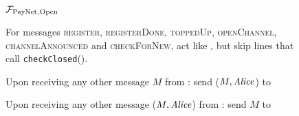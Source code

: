 \begin{figure}[H]
  \begin{systembox}{$\mathcal{F}_{\mathrm{PayNet}}{}_{\mathrm{, Open}}$}
    \begin{algorithmic}[1]
      \State For messages \textsc{register}, \textsc{registerDone},
      \textsc{toppedUp}, \textsc{openChannel}, \textsc{channelAnnounced} and
      \textsc{checkForNew}, act like \fpaynet{}, but skip lines that call
      \texttt{checkClosed}().
      \Statex

      \State Upon receiving any other message $M$ from \alice:
      \Indent
          \State send ($M, \mathit{Alice}$) to \simulator
        \EndIf
      \EndIndent
      \Statex

      \State Upon receiving any other message ($M, \mathit{Alice}$) from \simulator:
      \Indent
          \State send $M$ to \alice
        \EndIf
      \EndIndent
    \end{algorithmic}
  \end{systembox}
  \caption{}
  \label{alg:proof:fpaynet:open}
\end{figure}

